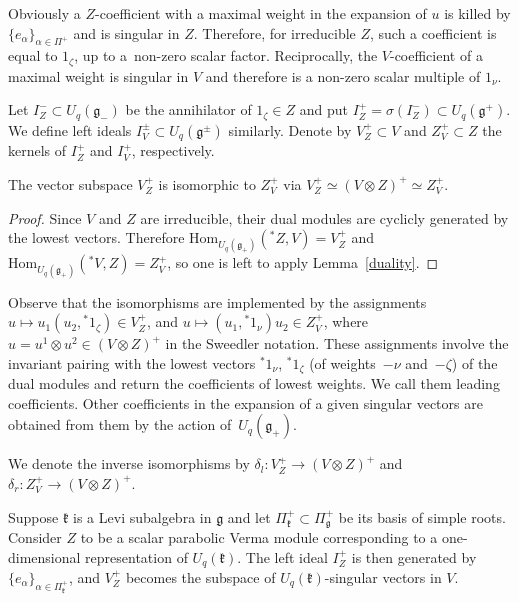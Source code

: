 Obviously a $Z$-coefficient with a maximal weight in the expansion of $u$ is killed by $\{e_\alpha\}_{\alpha \in \Pi^+}$ and is singular in $Z$. Therefore, for irreducible $Z$, such a coefficient is equal to $1_\zeta$, up to a~non-zero scalar factor. Reciprocally, the $V$-coefficient of a maximal weight is singular in $V$ and therefore is a non-zero scalar multiple of $1_\nu$.

Let $I^-_Z\subset U_q(\mathfrak{g}_-)$ be the annihilator of $1_\zeta\in Z$ and put $I^+_Z=\sigma(I^-_Z)\subset U_q(\mathfrak{g}^+)$. We define left ideals $I^\pm_V \subset U_q(\mathfrak{g}^\pm)$ similarly. Denote by $V^+_Z\subset V$ and $Z^+_V\subset Z$ the kernels of $I^+_Z$ and $I^+_V$, respectively.
\begin{Proposition}\label{V-Z-extr}The vector subspace $V^+_Z$ is isomorphic to $Z^+_V$ via $V^+_Z\simeq (V\otimes Z)^+\simeq Z^+_V$.
\end{Proposition}
\begin{proof}Since $V$ and $Z$ are irreducible, their dual modules are cyclicly generated by the lowest vectors. Therefore $\mathrm{Hom}_{U_q(\mathfrak{g}_+)}({}^*\!Z,V)=V^+_Z$ and $\mathrm{Hom}_{U_q(\mathfrak{g}_+)}({}^*\!V,Z)=Z^+_V$, so one is left to apply Lemma~\ref{duality}.
\end{proof}

Observe that the isomorphisms are implemented by the assignments $u\mapsto u_1 (u_2, {}^*\!1_{\zeta})\in V^+_Z$, and $u\mapsto ( u_1, {}^*\!1_{\nu}) u_2 \in Z^+_V$, where $u=u^1\otimes u^2\in (V\otimes Z)^+$ in the Sweedler notation. These assignments involve the invariant pairing with the lowest vectors ${}^*\!1_{\nu}$, ${}^*\!1_{\zeta}$ (of weights~$-\nu$ and~$-\zeta$) of the dual modules and return the coefficients of lowest weights. We call them leading coefficients. Other coefficients in the expansion of a given singular vectors are obtained from them by the action of~$U_q(\mathfrak{g}_+)$.

We denote the inverse isomorphisms by $\delta_l \colon V^+_Z\to (V\otimes Z)^+$ and $\delta_r\colon Z^+_V\to (V\otimes Z)^+$.

\begin{Example}Suppose $\mathfrak{k}$ is a Levi subalgebra in $\mathfrak{g}$ and let $\Pi^+_\mathfrak{k}\subset \Pi^+_\mathfrak{g}$ be its basis of simple roots. Consider $Z$ to be a scalar parabolic Verma module corresponding to a one-dimensional representation of $U_q(\mathfrak{k})$. The left ideal $I^+_Z$ is then generated by $\{e_\alpha\}_{\alpha\in \Pi^+_\mathfrak{k}}$, and $V^+_Z$ becomes the subspace of $U_q(\mathfrak{k})$-singular vectors in $V$.
\end{Example}


